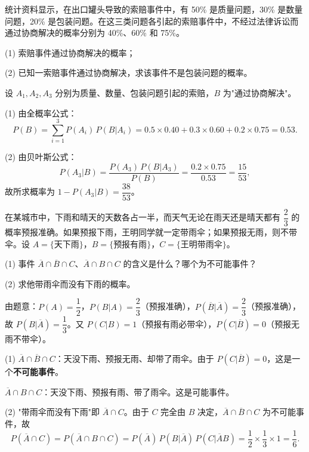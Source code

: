 ﻿\documentclass[lang=cn,11pt]{elegantbook}
\begin{document}
\begin{exercise}\label{exer:1-53}
统计资料显示，在出口罐头导致的索赔事件中，有 50\% 是质量问题，30\% 是数量问题，20\% 是包装问题。在这三类问题各引起的索赔事件中，不经过法律诉讼而通过协商解决的概率分别为 40\%、60\% 和 75\%。\par
(1) 索赔事件通过协商解决的概率；\par
(2) 已知一索赔事件通过协商解决，求该事件不是包装问题的概率。
\end{exercise}

\begin{solution}
设 \(A_1,A_2,A_3\) 分别为质量、数量、包装问题引起的索赔，\(B\) 为"通过协商解决"。

(1) 由全概率公式：
\[
P(B) = \sum_{i=1}^{3}P(A_i)\,P(B|A_i) = 0.5\times 0.40 + 0.3\times 0.60 + 0.2\times 0.75 = 0.53.
\]

(2) 由贝叶斯公式：
\[
P(A_3|B) = \frac{P(A_3)\,P(B|A_3)}{P(B)} = \frac{0.2\times 0.75}{0.53} = \frac{15}{53},
\]
故所求概率为 \(1-P(A_3|B) = \dfrac{38}{53}\)。
\end{solution}

\begin{exercise}\label{exer:1-54}
在某城市中，下雨和晴天的天数各占一半，而天气无论在雨天还是晴天都有 \(\dfrac{2}{3}\) 的概率预报准确。如果预报下雨，王明同学就一定带雨伞；如果预报无雨，则不带伞。设 \(A=\{\text{天下雨}\}\)，\(B=\{\text{预报有雨}\}\)，\(C=\{\text{王明带雨伞}\}\)。\par
(1) 事件 \(\overline{A}\cap\overline{B}\cap C\)、\(\overline{A}\cap B\cap C\) 的含义是什么？哪个为不可能事件？\par
(2) 求他带雨伞而没有下雨的概率。
\end{exercise}

\begin{solution}
由题意：\(P(A)=\dfrac{1}{2}\)，\(P(B|A)=\dfrac{2}{3}\)（预报准确），\(P(\overline{B}|\overline{A})=\dfrac{2}{3}\)（预报准确），故 \(P(B|\overline{A})=\dfrac{1}{3}\)。又 \(P(C|B)=1\)（预报有雨必带伞），\(P(C|\overline{B})=0\)（预报无雨不带伞）。

(1) \(\overline{A}\cap\overline{B}\cap C\)：天没下雨、预报无雨、却带了雨伞。由于 \(P(C|\overline{B})=0\)，这是一个\textbf{不可能事件}。\par
\(\overline{A}\cap B\cap C\)：天没下雨、预报有雨、带了雨伞。这是可能事件。

(2) "带雨伞而没有下雨"即 \(\overline{A}\cap C\)。由于 \(C\) 完全由 \(B\) 决定，\(\overline{A}\cap\overline{B}\cap C\) 为不可能事件，故
\[
P(\overline{A}\cap C) = P(\overline{A}\cap B\cap C) = P(\overline{A})\,P(B|\overline{A})\,P(C|\overline{A}B) = \frac{1}{2}\times\frac{1}{3}\times 1 = \frac{1}{6}.
\]
\end{solution}
\end{document}
